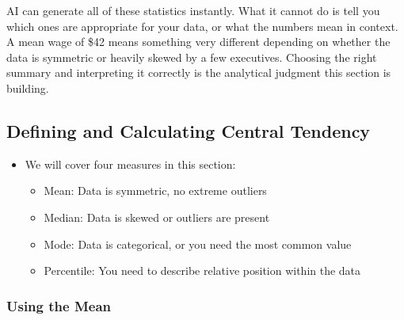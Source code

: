 \documentclass[
  letterpaper,
  DIV=11,
  numbers=noendperiod]{scrreprt}
\providecommand{\tightlist}{%
  \setlength{\itemsep}{0pt}\setlength{\parskip}{0pt}}\usepackage{longtable,booktabs,array}
\begin{document}
AI can generate all of these statistics instantly. What it cannot do is
tell you which ones are appropriate for your data, or what the numbers
mean in context. A mean wage of \$42 means something very different
depending on whether the data is symmetric or heavily skewed by a few
executives. Choosing the right summary and interpreting it correctly is
the analytical judgment this section is building.

\subsection{Defining and Calculating Central
Tendency}\label{defining-and-calculating-central-tendency}

\begin{itemize}
\tightlist
\item
  We will cover four measures in this section:

  \begin{itemize}
  \tightlist
  \item
    Mean: Data is symmetric, no extreme outliers
  \item
    Median: Data is skewed or outliers are present
  \item
    Mode: Data is categorical, or you need the most common value
  \item
    Percentile: You need to describe relative position within the data
  \end{itemize}
\end{itemize}

\subsubsection{Using the Mean}\label{using-the-mean}
\end{document}
